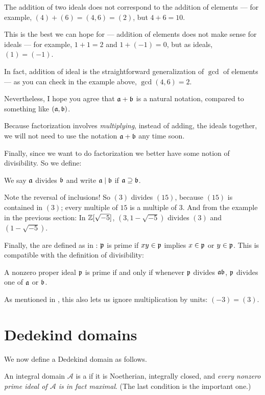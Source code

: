 \begin{remark}
	The addition of two ideals does not correspond to the addition of elements --- for example, $(4)+(6)=(4, 6)=(2)$, but $4+6=10$.

	This is the best we can hope for --- addition of elements does not make sense for ideals --- for example, $1+1=2$ and $1+(-1)=0$, but as ideals, $(1)=(-1)$.

	In fact, addition of ideal is the straightforward generalization of $\gcd$ of elements --- as you can check in the example above, $\gcd(4, 6)=2$.

	Nevertheless, I hope you agree that $\mathfrak a+\mathfrak b$ is a natural notation, compared to something like $(\mathfrak a, \mathfrak b)$.

	Because factorization involves \emph{multiplying}, instead of adding, the ideals together, we will not need to use the notation $\mathfrak a+\mathfrak b$ any time soon.
\end{remark}

Finally, since we want to do factorization we better have some notion of divisibility.
So we define:
\begin{definition}
	We say $\mathfrak a$ divides $\mathfrak b$ and write $\mathfrak a \mid \mathfrak b$ if $\mathfrak a \supseteq \mathfrak b$.
\end{definition}
Note the reversal of inclusions!
So $(3)$ divides $(15)$, because $(15)$ is contained in $(3)$;
every multiple of $15$ is a multiple of $3$.
And from the example in the previous section: In $\mathbb Z[\sqrt{-5}]$,
$(3,1-\sqrt{-5})$ divides $(3)$ and $(1 - \sqrt{-5})$.

Finally, the  are defined as in :
$\mathfrak p$ is prime if $xy \in \mathfrak p$ implies $x \in \mathfrak p$ or $y \in \mathfrak p$.
This is compatible with the definition of divisibility:
\begin{exercise}
	A nonzero proper ideal $\mathfrak p$ is prime
	if and only if whenever $\mathfrak p$ divides $\mathfrak a \mathfrak b$,
	$\mathfrak p$ divides one of $\mathfrak a$ or $\mathfrak b$.
\end{exercise}
As mentioned in ,
this also lets us ignore multiplication by units: $(-3) = (3)$.

\section{Dedekind domains}
We now define a Dedekind domain as follows.
\begin{definition}
	An integral domain $\mathcal A$ is a 
	if it is Noetherian, integrally closed, and
	\emph{every nonzero prime ideal of $\mathcal A$ is in fact maximal}.
	(The last condition is the important one.)
\end{definition}

